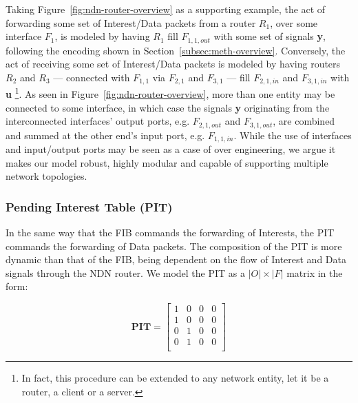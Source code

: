 Taking Figure~\ref{fig:ndn-router-overview} as a supporting example, the act of 
forwarding some set of Interest\slash Data packets from a router $R_1$, 
over some interface $F_1$, is modeled by having $R_1$ fill $F_{1,1,out}$ with 
some set of signals \textbf{y}, following the encoding shown in 
Section~\ref{subsec:meth-overview}. Conversely, the act of receiving some set 
of Interest\slash Data packets is modeled by having routers $R_2$ and $R_3$ --- 
connected with $F_{1,1}$ via $F_{2,1}$ and $F_{3,1}$ --- fill $F_{2,1,in}$ and $F_{3,1,in}$ 
with \textbf{u} \footnote{In fact, this procedure can be extended to any network entity, let 
it be a router, a client or a server.}. As seen in Figure~\ref{fig:ndn-router-overview}, 
more than one entity may be connected to some interface, in which case the 
signals \textbf{y} originating from the interconnected interfaces' output ports, 
e.g. $F_{2,1,out}$ and $F_{3,1,out}$, are combined and summed at the other 
end's input port, e.g. $F_{1,1,in}$. While the use of interfaces and 
input\slash output ports may be seen as a case of over engineering, we argue 
it makes our model robust, highly modular and capable of supporting multiple 
network topologies.\shortvertbreak

\subsubsection{Pending Interest Table (PIT)}
\label{subsec:meth-pit}

In the same way that the FIB commands the forwarding of Interests, the PIT 
commands the forwarding of Data packets. The composition of the 
PIT is more dynamic than that of the FIB, being dependent on the flow of 
Interest and Data signals through the NDN router. We model the PIT as a 
$|O| \times |F|$ matrix in the form:

\begin{equation}
\textbf{PIT} = \begin{bmatrix} 1 & 0 & 0 & 0  \\ 
                1 & 0 & 0 & 0               \\ 
                0 & 1 & 0 & 0               \\ 
                0 & 1 & 0 & 0               \\ \end{bmatrix}
    \label{eq:pit}
\end{equation}\shortvertbreak

